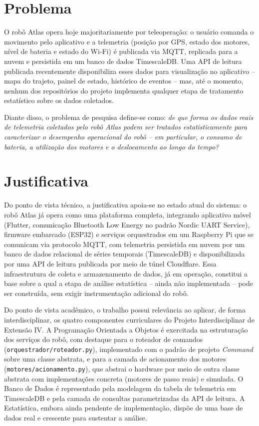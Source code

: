 \section{Problema} \label{sec:Problem}
O robô Atlas opera hoje majoritariamente por teleoperação: o usuário comanda o movimento pelo aplicativo e a telemetria (posição por GPS, estado dos motores, nível de bateria e estado do Wi-Fi) é publicada via MQTT, replicada para a nuvem e persistida em um banco de dados TimescaleDB. Uma API de leitura publicada recentemente disponibiliza esses dados para visualização no aplicativo -- mapa do trajeto, painel de estado, histórico de eventos -- mas, até o momento, nenhum dos repositórios do projeto implementa qualquer etapa de tratamento estatístico sobre os dados coletados.

Diante disso, o problema de pesquisa define-se como: \textit{de que forma os dados reais de telemetria coletados pelo robô Atlas podem ser tratados estatisticamente para caracterizar o desempenho operacional do robô -- em particular, o consumo de bateria, a utilização dos motores e o deslocamento ao longo do tempo?}

\section{Justificativa} \label{sec:justification}
Do ponto de vista técnico, a justificativa apoia-se no estado atual do sistema: o robô Atlas já opera como uma plataforma completa, integrando aplicativo móvel (Flutter, comunicação Bluetooth Low Energy no padrão Nordic UART Service), firmware embarcado (ESP32) e serviços orquestrados em um Raspberry Pi que se comunicam via protocolo MQTT, com telemetria persistida em nuvem por um banco de dados relacional de séries temporais (TimescaleDB) e disponibilizada por uma API de leitura publicada por meio de túnel Cloudflare. Essa infraestrutura de coleta e armazenamento de dados, já em operação, constitui a base sobre a qual a etapa de análise estatística -- ainda não implementada -- pode ser construída, sem exigir instrumentação adicional do robô.

Do ponto de vista acadêmico, o trabalho possui relevância ao aplicar, de forma interdisciplinar, os quatro componentes curriculares do Projeto Interdisciplinar de Extensão IV. A Programação Orientada a Objetos é exercitada na estruturação dos serviços do robô, com destaque para o roteador de comandos (\texttt{orquestrador/roteador.py}), implementado com o padrão de projeto \textit{Command} \cite{gamma2000} sobre uma classe abstrata, e para a camada de acionamento dos motores (\texttt{motores/acionamento.py}), que abstrai o hardware por meio de outra classe abstrata com implementações concreta (motores de passo reais) e simulada. O Banco de Dados é representado pela modelagem da tabela de telemetria em TimescaleDB e pela camada de consultas parametrizadas da API de leitura. A Estatística, embora ainda pendente de implementação, dispõe de uma base de dados real e crescente para sustentar a análise.

